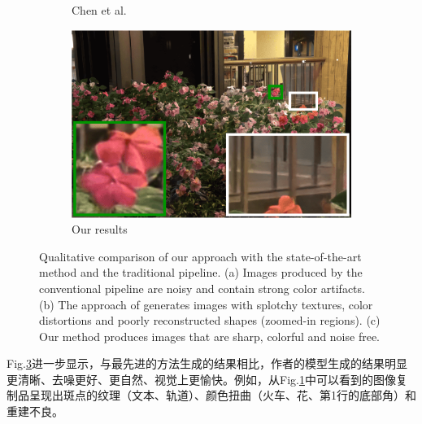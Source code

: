 \documentclass[letterpaper,12pt]{article}
\begin{document}
\begin{figure}[htbp]
\begin{subfigure}{0.3\textwidth}
				\captionsetup{font=scriptsize}
				\caption{Chen et al.\cite{chen2018learning}}
				\label{fig: qualitative_comparison_h}  
			\end{subfigure}
			\begin{subfigure}{0.3\textwidth}
				\includegraphics[width=\linewidth]{qualitative_comparison/i}
				\captionsetup{font=scriptsize}
				\caption{Our results}
				\label{fig: qualitative_comparison_i}  
			\end{subfigure}
			
			\captionsetup{font=scriptsize}
			\caption{
				\label{fig: Qualitative comparison of our approach}
				Qualitative comparison of our approach with the state-of-the-art method\cite{chen2018learning} and the traditional pipeline. (a) Images produced by the conventional pipeline are noisy and contain strong color artifacts. (b) The approach of \cite{chen2018learning} generates images with splotchy textures, color distortions and poorly reconstructed shapes (zoomed-in regions). (c) Our method produces images that are sharp, colorful and noise free.
			}
		\end{figure}
	
		Fig.\ref{fig: Qualitative comparison of our approach}进一步显示，与最先进的方法\cite{chen2018learning}生成的结果相比，作者的模型生成的结果明显更清晰、去噪更好、更自然、视觉上更愉快。例如，从Fig.\ref{fig: qualitative_comparison_h}中可以看到\cite{chen2018learning}的图像复制品呈现出斑点的纹理（文本、轨道）、颜色扭曲（火车、花、第1行的底部角）和重建不良。
		
\end{document}
